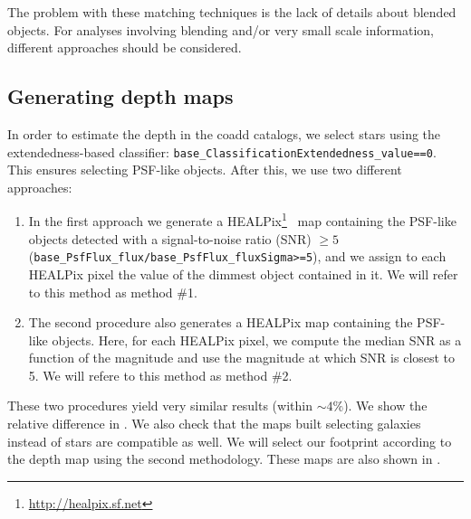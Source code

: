\documentclass[twocolumn]{aastex62}
\begin{document}
The problem with these matching techniques is the lack of details about blended objects. For analyses involving blending and/or very small scale information, different approaches should be considered.


\subsection{Generating depth maps}
\label{sec:masking}

In order to estimate the depth in the coadd catalogs, we select stars using the extendedness-based classifier: \texttt{base\_ClassificationExtendedness\_value==0}. This ensures selecting
PSF-like objects. After this, we use two different approaches:

\begin{enumerate}
\item In the first approach we generate a HEALPix\footnote{\url{http://healpix.sf.net}}~\citep{2005ApJ...622..759G} map containing the PSF-like objects detected with a signal-to-noise ratio (SNR) $\geq 5$ (\texttt{base\_PsfFlux\_flux/base\_PsfFlux\_fluxSigma>=5}), and we assign to each HEALPix pixel the value of the
dimmest object contained in it. We will refer to this method as method \#1.
\item The second procedure also generates a HEALPix map containing the PSF-like objects. Here, for each HEALPix pixel, we compute the median SNR as a function of the magnitude and use the magnitude at which SNR is closest to 5. We will refere to this method as method \#2.
\end{enumerate}

These two procedures yield very similar results (within $\sim 4\%$). We show the relative difference in . We also check that the maps built selecting galaxies instead of stars are compatible as well. We will select our footprint according to the depth map using the second methodology. These maps are also shown in .
\end{document}
